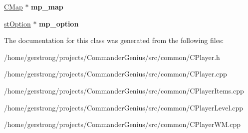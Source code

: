 \begin{DoxyCompactItemize}
\item 
\hypertarget{class_c_player_a640d55cddc3c45d791b8c8597a193f27}{
\hyperlink{class_c_map}{CMap} $\ast$ {\bfseries mp\_\-map}}
\label{class_c_player_a640d55cddc3c45d791b8c8597a193f27}

\item 
\hypertarget{class_c_player_a686a7cdb50db87be9ee4e6d350684a9f}{
\hyperlink{structst_option}{stOption} $\ast$ {\bfseries mp\_\-option}}
\label{class_c_player_a686a7cdb50db87be9ee4e6d350684a9f}

\end{DoxyCompactItemize}


The documentation for this class was generated from the following files:\begin{DoxyCompactItemize}
\item 
/home/gerstrong/projects/CommanderGenius/src/common/CPlayer.h\item 
/home/gerstrong/projects/CommanderGenius/src/common/CPlayer.cpp\item 
/home/gerstrong/projects/CommanderGenius/src/common/CPlayerItems.cpp\item 
/home/gerstrong/projects/CommanderGenius/src/common/CPlayerLevel.cpp\item 
/home/gerstrong/projects/CommanderGenius/src/common/CPlayerWM.cpp\end{DoxyCompactItemize}

